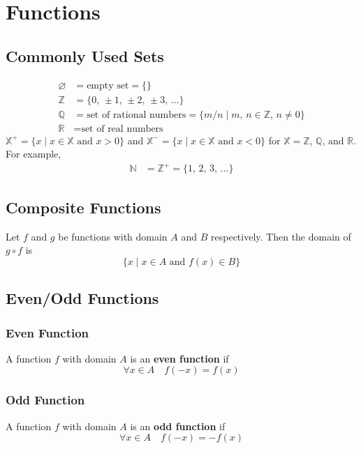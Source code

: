 \documentclass[../ma2002_notes.tex]{subfiles}
\begin{document}
\section{Functions}
\subsection{Commonly Used Sets}
\begin{align*}
\varnothing &= \text{empty set} = \{\} \\
\mathbb{Z} &= \{0,\,\pm1,\,\pm2,\,\pm3,\,\ldots\} \\
\mathbb{Q} &= \text{set of rational numbers} = \{m/n \mid m,\,n\in\mathbb{Z},\,n\ne0\} \\
\mathbb{R} &= \text{set of real numbers}
\end{align*}
\(\mathbb{X}^+ = \{x\mid x\in\mathbb{X}\text{ and }x>0\}\) and \(\mathbb{X}^- = \{x\mid x\in\mathbb{X}\text{ and }x<0\}\) for \(\mathbb{X}=\mathbb{Z},\,\mathbb{Q},\,\text{and }\mathbb{R}\). For example,
\begin{align*}
\mathbb{N} &= \mathbb{Z^+} = \{1,\,2,\,3,\,\ldots\}
\end{align*}

\subsection{Composite Functions}
Let \(f\) and \(g\) be functions with domain \(A\) and \(B\) respectively. Then the domain of \(g\circ f\) is
\[\{x \mid x \in A \text{ and } f(x) \in B \}\]

\subsection{Even/Odd Functions}
\subsubsection{Even Function}
A function \(f\) with domain \(A\) is an \textbf{even function} if
\[\forall x\in A \quad f(-x)=f(x)\]

\subsubsection{Odd Function}
A function \(f\) with domain \(A\) is an \textbf{odd function} if
\[\forall x\in A \quad f(-x)=-f(x)\]
\end{document}
